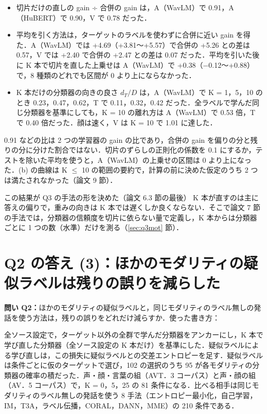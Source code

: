 \documentclass[a4paper,10pt]{ltjsarticle}
\newcommand{\toihead}[4][]{\begin{headbar}[#2]\textbf{\textcolor{#2}{問い #3：}}#4\if\relax\detokenize{#1}\relax\else\hfill{\small 使った書き方：}#1\fi\end{headbar}}
\newcommand{\pagesection}[1]{\clearpage\section{#1}}
\newcommand{\shiryo}[1]{\ref{#1} 節}
\begin{document}
\begin{itemize}
  \item 切片だけの直しの gain ÷ 合併の gain は，A（WavLM）で 0.91，A（HuBERT）で 0.90，V で 0.78 だった．
  \item 平均を引く方法は，ターゲットのラベルを使わずに合併に近い gain を得た．A（WavLM）では +4.69（+3.81〜+5.57）で合併の +5.26 との差は 0.57，V では +2.40 で合併の +2.47 との差は 0.07 だった．平均を引いた後に K 本で切片を直した上乗せは A（WavLM）で +0.38（−0.12〜+0.88）で，8 種類のどれでも区間が 0 より上にならなかった．
  \item K 本だけの分類器の向きの良さ $d_T/D$ は，A（WavLM）で K = 1，5，10 のとき 0.23，0.47，0.62，T で 0.11，0.32，0.42 だった．全ラベルで学んだ同じ分類器を基準にしても，K = 10 の離れ方は A（WavLM）で 0.53 倍，T で 0.40 倍だった．顔は速く，V は K = 10 で 1.01 に達した．
\end{itemize}

\begin{yowai}
0.91 などの比は 2 つの学習器の gain の比であり，合併の gain を偏りの分と残りの分に分けた割合ではない．切片のずらしの正則化の係数を 0.1 にするか，テストを除いた平均を使うと，A（WavLM）の上乗せの区間は 0 より上になった．(b) の曲線は K $\le$ 10 の範囲の要約で，計算の前に決めた仮定のうち 2 つは満たされなかった（論文 9 節）．
\end{yowai}

\begin{setsu}{この結果が Q3 の手法の形を決めた（論文 6.3 節の最後）}
K 本が直すのは主に答えの偏りで，重みの向きは K 本では遅くしか良くならない．そこで論文 7 節の手法では，分類器の信頼度を切片に依らない量で定義し，K 本からは分類器ごとに 1 つの数（水準）だけを測る（\shiryo{sec:q3mot}）．
\end{setsu}

\pagesection{Q2 の答え (3)：ほかのモダリティの疑似ラベルは残りの誤りを減らした}\label{sec:q2pl}
\toihead{cQ2}{Q2}{ほかのモダリティの疑似ラベルと，同じモダリティのラベル無しの発話を使う方法は，残りの誤りをどれだけ減らすか．}

\noindent 全ソース設定で，ターゲット以外の全群で学んだ分類器をアンカーにし，K 本で学び直した分類器（全ソース設定の K 本だけ）を基準にした．疑似ラベルによる学び直しは，この損失に疑似ラベルとの交差エントロピーを足す．疑似ラベルは条件ごとに仮のターゲットで選び，102 の選択のうち 95 が各モダリティの分類器の確率の積だった．声・顔・言葉の組（AVT．3 コーパス）と声・顔の組（AV．5 コーパス）で，K = 0，5，25 の 81 条件になる．比べる相手は同じモダリティのラベル無しの発話を使う 8 手法（エントロピー最小化，自己学習，IM，T3A，ラベル伝播，CORAL，DANN，MME）の 210 条件である．
\end{document}
